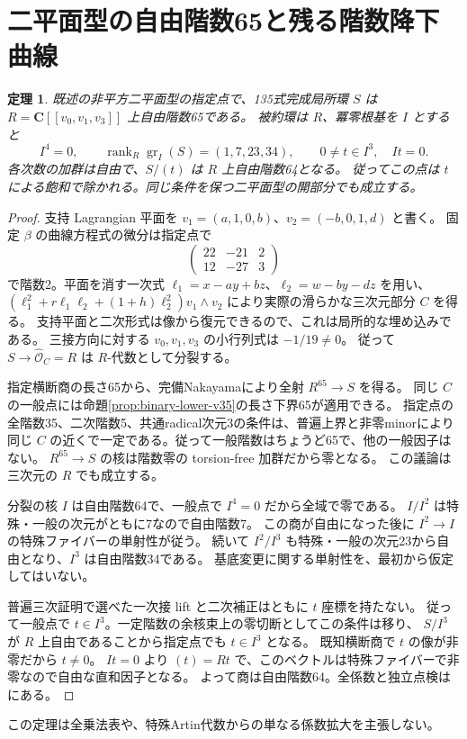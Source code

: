 \documentclass[11pt,a4paper]{ltjsarticle}
\newcommand{\CC}{\mathbf C}
\DeclareMathOperator{\rank}{rank}
\newtheorem{theorem}{定理}[section]
\theoremstyle{remark}
\begin{document}
\section{二平面型の自由階数65と残る階数降下曲線}
\begin{theorem}\label{thm:binary-free-v36}
既述の非平方二平面型の指定点で、135式完成局所環 $S$ は
$R=\CC[[v_0,v_1,v_3]]$ 上自由階数65である。
被約環は $R$、冪零根基を $I$ とすると
\[
 I^4=0,\qquad \rank_R\operatorname{gr}_I(S)=(1,7,23,34),\qquad
 0\ne t\in I^3,\quad It=0.
\]
各次数の加群は自由で、$S/(t)$ は $R$ 上自由階数64となる。
従ってこの点は $t$ による飽和で除かれる。同じ条件を保つ二平面型の開部分でも成立する。
\end{theorem}
\begin{proof}
支持 Lagrangian 平面を
$v_1=(a,1,0,b)$、$v_2=(-b,0,1,d)$ と書く。
固定 $\beta$ の曲線方程式の微分は指定点で
\[
 \begin{pmatrix}22&-21&2\\12&-27&3\end{pmatrix}
\]
で階数2。平面を消す一次式 $\ell_1=x-ay+bz$、$\ell_2=w-by-dz$ を用い、
$(\ell_1^2+r\ell_1\ell_2+(1+h)\ell_2^2)v_1\wedge v_2$ により実際の滑らかな三次元部分 $C$ を得る。
支持平面と二次形式は像から復元できるので、これは局所的な埋め込みである。
三接方向に対する $v_0,v_1,v_3$ の小行列式は $-1/19\ne0$。
従って $S\to\widehat{\mathcal O}_C=R$ は $R$-代数として分裂する。

指定横断商の長さ65から、完備Nakayamaにより全射 $R^{65}\to S$ を得る。
同じ $C$ の一般点には命題\ref{prop:binary-lower-v35}の長さ下界65が適用できる。
指定点の全階数35、二次階数5、共通radical次元3の条件は、普遍上界と非零minorにより
同じ $C$ の近くで一定である。従って一般階数はちょうど65で、他の一般因子はない。
$R^{65}\to S$ の核は階数零の torsion-free 加群だから零となる。
この議論は三次元の $R$ でも成立する。

分裂の核 $I$ は自由階数64で、一般点で $I^4=0$ だから全域で零である。
$I/I^2$ は特殊・一般の次元がともに7なので自由階数7。
この商が自由になった後に $I^2\to I$ の特殊ファイバーの単射性が従う。
続いて $I^2/I^3$ も特殊・一般の次元23から自由となり、$I^3$ は自由階数34である。
基底変更に関する単射性を、最初から仮定してはいない。

普遍三次証明で選べた一次接 lift と二次補正はともに $t$ 座標を持たない。
従って一般点で $t\in I^3$。一定階数の余核束上の零切断としてこの条件は移り、
$S/I^3$ が $R$ 上自由であることから指定点でも $t\in I^3$ となる。
既知横断商で $t$ の像が非零だから $t\ne0$。
$It=0$ より $(t)=Rt$ で、このベクトルは特殊ファイバーで非零なので自由な直和因子となる。
よって商は自由階数64。全係数と独立点検は\cite{binary-formal-v36}にある。
\end{proof}
この定理は全乗法表や、特殊Artin代数からの単なる係数拡大を主張しない。
\end{document}
